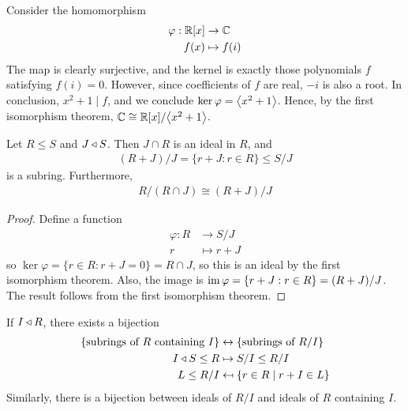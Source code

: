 \documentclass{../template/note}
\begin{document}
    \begin{example}
        Consider the homomorphism
        \begin{align*}
            \varphi: \mathbb R[x] &\to \mathbb C \\
            f(x) &\mapsto f(i)
        \end{align*}
        The map is clearly surjective, and the kernel is exactly those polynomials $f$ satisfying $f(i) = 0$. However, since coefficients of $f$ are real, $-i$ is also a root. In conclusion, $x^2 + 1 \mid f$, and we conclude $\ker \varphi = \left \langle x^2+1 \right \rangle$. Hence, by the first isomorphism theorem, $\mathbb C \cong \mathbb R[x]/\!\left \langle x^2+1 \right \rangle$.        
    \end{example}
    
    \begin{proposition}
        Let $R \leq S$ and $J \triangleleft S$. Then $J \cap R$ is an ideal in $R$, and
        \begin{align*}
            (R+J)/J = \{r + J: r \in R\} \leq S/J
        \end{align*}
        is a subring. Furthermore,
        \begin{align*}
            R/(R \cap J) \cong (R+J)/J
        \end{align*}
    \end{proposition}
    
    \begin{proof}
        Define a function
        \begin{align*}
            \varphi: R &\to S/J \\
            r &\mapsto r + J
        \end{align*}
        so $\ker \varphi = \{r \in R: r + J = 0\} = R \cap J$, so this is an ideal by the first isomorphism theorem. Also, the image is $\operatorname{im} \varphi = \{r + J: r \in R\} = (R + J)/J$. The result follows from the first isomorphism theorem.        
    \end{proof}
    

    \begin{theorem}
        If $I \triangleleft R$, there exists a bijection
        \begin{align*}
            \{\text{subrings of } R \text{ containing } I\} &\leftrightarrow \{\text{subrings of } R/I\} \\
            I \triangleleft S \leq R &\mapsto S/I \leq R/I \\
            L \leq R/I &\mapsfrom \{r \in R \mid r + I \in L\}
        \end{align*}
        Similarly, there is a bijection between ideals of $R/I$ and ideals of $R$ containing $I$.        
    \end{theorem}
    
\end{document}
